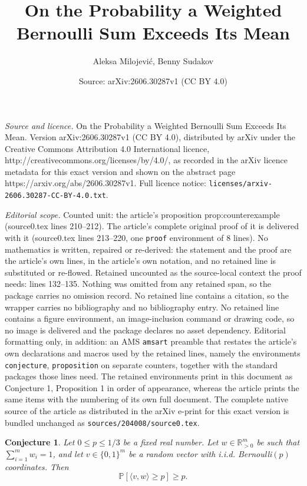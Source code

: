 \documentclass[10pt,a4paper]{amsart}
\title{On the Probability a Weighted Bernoulli Sum Exceeds Its Mean}
\author{Aleksa Milojevi\'c, Benny Sudakov}
\date{Source: arXiv:2606.30287v1 (CC BY 4.0)}
\newtheorem{conjecture}{Conjecture}
\def\Pb{\mathbb{P}}
\def\bR{\mathbb{R}}
\begin{document}
\maketitle

\noindent\emph{Source and licence.} On the Probability a Weighted Bernoulli Sum Exceeds Its Mean. Version arXiv:2606.30287v1 (CC BY 4.0), distributed by arXiv under the Creative Commons Attribution 4.0 International licence, http://creativecommons.org/licenses/by/4.0/, as recorded in the arXiv licence metadata for this exact version and shown on the abstract page https://arxiv.org/abs/2606.30287v1. Full licence notice: \texttt{licenses/arxiv-2606.30287-CC-BY-4.0.txt}.\par\smallskip

\noindent\textit{Editorial scope.} Counted unit: the article's proposition prop:counterexample (source0.tex lines 210--212). The article's complete original proof of it is delivered with it (source0.tex lines 213--220, one \texttt{proof} environment of 8 lines). No mathematics is written, repaired or re-derived: the statement and the proof are the article's own lines, in the article's own notation, and no retained line is substituted or re-flowed.  Retained uncounted as the source-local context the proof needs: lines 132--135.  Nothing was omitted from any retained span, so the package carries no omission record.  No retained line contains a citation, so the wrapper carries no bibliography and no bibliography entry.  No retained line contains a figure environment, an image-inclusion command or drawing code, so no image is delivered and the package declares no asset dependency.  Editorial formatting only, in addition: an AMS \texttt{amsart} preamble that restates the article's own declarations and macros used by the retained lines, namely the environments \texttt{conjecture}, \texttt{proposition} on separate counters, together with the standard packages those lines need.  The retained environments print in this document as Conjecture 1, Proposition 1 in order of appearance, whereas the article prints the same items with the numbering of its own full document.  The complete native source of the article as distributed in the arXiv e-print for this exact version is bundled unchanged as \texttt{sources/204008/source0.tex}.
\begin{conjecture}\label{conj:prob}
Let $0\leq p\leq 1/3$ be a fixed real number. Let $w\in \bR_{>0}^m$ be such that $\sum_{i=1}^m w_i=1$, and let $v\in \{0, 1\}^m$ be a random vector with i.i.d. Bernoulli$(p)$ coordinates. Then
\[\Pb[\langle v, w\rangle\geq p]\geq p.\]
\end{conjecture}
\end{document}
